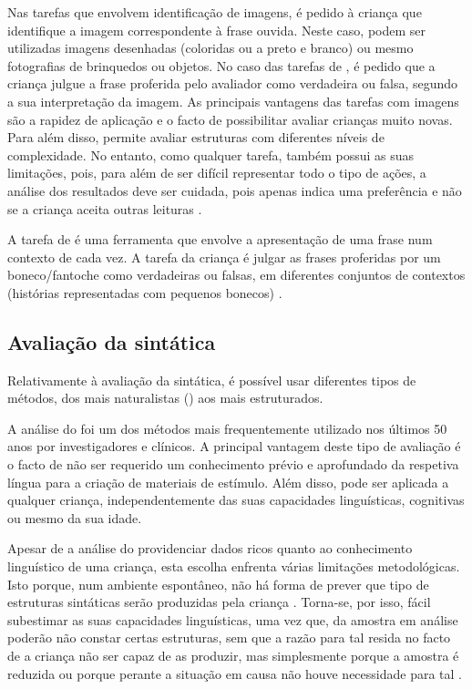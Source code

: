 \documentclass[output=paper]{LSP/langsci}
\begin{document}
Nas tarefas que envolvem identificação de imagens, é pedido à criança que identifique a imagem correspondente à frase ouvida. Neste caso, podem ser utilizadas imagens desenhadas (coloridas ou a preto e branco) ou mesmo fotografias de brinquedos ou objetos. No caso das tarefas de , é pedido que a criança julgue a frase proferida pelo avaliador como verdadeira ou falsa, segundo a sua interpretação da imagem. As principais vantagens das tarefas com imagens são a rapidez de aplicação e o facto de possibilitar avaliar crianças muito novas. Para além disso, permite avaliar estruturas com diferentes níveis de complexidade. No entanto, como qualquer tarefa, também possui as suas limitações, pois, para além de ser difícil representar todo o tipo de ações, a análise dos resultados deve ser cuidada, pois apenas indica uma preferência e não se a criança aceita outras leituras \citep{schmittmiller2010}. 

A tarefa de  é uma ferramenta que envolve a apresentação de uma frase num contexto de cada vez. A tarefa da criança é julgar as frases proferidas por um boneco/fantoche como verdadeiras ou falsas, em diferentes conjuntos de contextos (histórias representadas com pequenos bonecos) \citep{crainthornton1998}.  

\subsection{Avaliação da  sintática}
\label{subsec:martins_avaliacao_prod}

Relativamente à avaliação da  sintática, é possível usar diferentes tipos de métodos, dos mais naturalistas () aos mais estruturados.

A análise do  foi um dos métodos mais frequentemente utilizado nos últimos 50 anos por investigadores e clínicos. A principal vantagem deste tipo de avaliação é o facto de não ser requerido um conhecimento prévio e aprofundado da respetiva língua para a criação de materiais de estímulo. Além disso, pode ser aplicada a qualquer criança, independentemente das suas capacidades linguísticas, cognitivas ou mesmo da sua idade.

Apesar de a análise do  providenciar dados ricos quanto ao conhecimento linguístico de uma criança, esta escolha enfrenta várias limitações metodológicas.  Isto porque, num ambiente espontâneo, não há forma de prever que tipo de estruturas sintáticas serão produzidas pela criança \citep{erlam2006}. Torna-se, por isso, fácil subestimar as suas capacidades linguísticas, uma vez que, da amostra em análise poderão não constar certas estruturas, sem que a razão para tal resida no facto de a criança não ser capaz de as produzir, mas simplesmente porque a amostra é reduzida ou porque perante a situação em causa não houve necessidade para tal \citep{mcdaniel_etal1998}.
\end{document}
